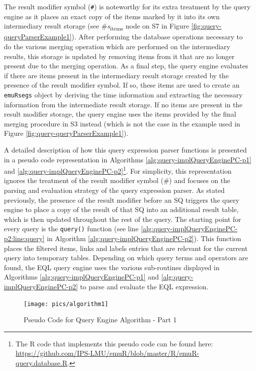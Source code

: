 \documentclass[]{book}
\begin{document}
The result modifier symbol (\texttt{\#}) is noteworthy for its extra treatment by the query engine as it places an exact copy of the items marked by it into its own intermediary result storage (see \#\emph{s}\textsubscript{items} node on S7 in Figure \ref{fig:query-queryParserExample1}). After performing the database operations necessary to do the various merging operation which are performed on the intermediary results, this storage is updated by removing items from it that are no longer present due to the merging operation. As a final step, the query engine evaluates if there are items present in the intermediary result storage created by the presence of the result modifier symbol. If so, these items are used to create an \texttt{emuRsegs} object by deriving the time information and extracting the necessary information from the intermediate result storage. If no items are present in the result modifier storage, the query engine uses the items provided by the final merging procedure in S3 instead (which is not the case in the example used in Figure \ref{fig:query-queryParserExample1}).

A detailed description of how this query expression parser functions is presented in a pseudo code representation in Algorithms \ref{alg:query-implQueryEnginePC-p1} and \ref{alg:query-implQueryEnginePC-p2}\footnote{The R code that implements this pseudo code can be found here: \url{https://github.com/IPS-LMU/emuR/blob/master/R/emuR-query.database.R}.}. For simplicity, this representation ignores the treatment of the result modifier symbol (\#) and focuses on the parsing and evaluation strategy of the query expression parser. As stated previously, the presence of the result modifier before an SQ triggers the query engine to place a copy of the result of that SQ into an additional result table, which is then updated throughout the rest of the query. The starting point for every query is the \texttt{query()} function (see line \ref{alg:query-implQueryEnginePC-p2:line:query} in Algorithm \ref{alg:query-implQueryEnginePC-p2}). This function places the filtered items, links and labels entries that are relevant for the current query into temporary tables. Depending on which query terms and operators are found, the EQL query engine uses the various sub-routines displayed in Algorithms \ref{alg:query-implQueryEnginePC-p1} and \ref{alg:query-implQueryEnginePC-p2} to parse and evaluate the EQL expression.

\begin{figure}

{\centering \texttt{[image: pics/algorithm1]} 

}

\caption{Pseudo Code for Query Engine Algorithm - Part 1}\label{fig:query-implQueryEnginePC-p1}
\end{figure}
\end{document}
